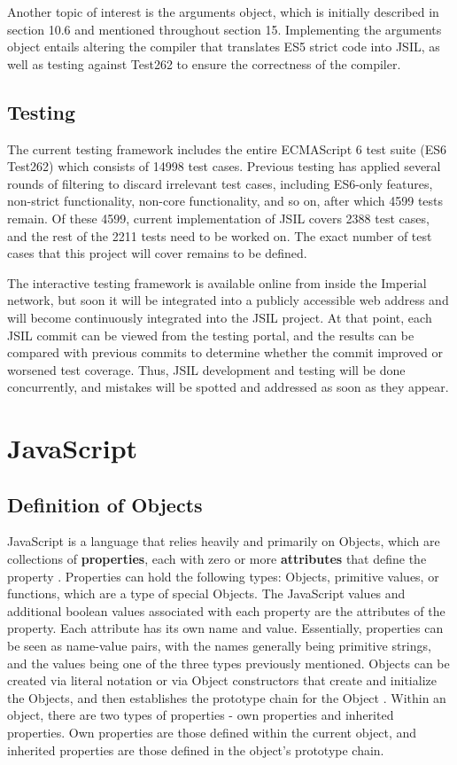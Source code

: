 \documentclass[a4paper,11pt,twoside]{report}
\begin{document}
Another topic of interest is the arguments object, which is initially described in section 10.6 and mentioned throughout section 15. Implementing the arguments object entails altering the compiler that translates ES5 strict code into JSIL, as well as testing against Test262 to ensure the correctness of the compiler.

\section{Testing}
The current testing framework includes the entire ECMAScript 6 test suite (ES6 Test262) which consists of 14998 test cases. Previous testing has applied several rounds of filtering to discard irrelevant test cases, including ES6-only features, non-strict functionality, non-core functionality, and so on, after which 4599 tests remain. Of these 4599, current implementation of JSIL covers 2388 test cases, and the rest of the 2211 tests need to be worked on. The exact number of test cases that this project will cover remains to be defined.

The interactive testing framework is available online from inside the Imperial network, but soon it will be integrated into a publicly accessible web address and will become continuously integrated into the JSIL project. At that point, each JSIL commit can be viewed from the testing portal, and the results can be compared with previous commits to determine whether the commit improved or worsened test coverage. Thus, JSIL development and testing will be done concurrently, and mistakes will be spotted and addressed as soon as they appear.

\chapter{JavaScript}\label{sec:javascript}
\section{Definition of Objects}
JavaScript is a language that relies heavily and primarily on Objects, which are collections of \textbf{properties}, each with zero or more \textbf{attributes} that define the property \cite{EcmaScript}. Properties can hold the following types: Objects, primitive values, or functions, which are a type of special Objects. The JavaScript values and additional boolean values associated with each property are the attributes of the property. Each attribute has its own name and value. Essentially, properties can be seen as name-value pairs, with the names generally being primitive strings, and the values being one of the three types previously mentioned. Objects can be created via literal notation or via Object constructors that create and initialize the Objects, and then establishes the prototype chain for the Object \cite{EcmaScript}. Within an object, there are two types of properties - own properties and inherited properties. Own properties are those defined within the current object, and inherited properties are those defined in the object's prototype chain.
\end{document}
